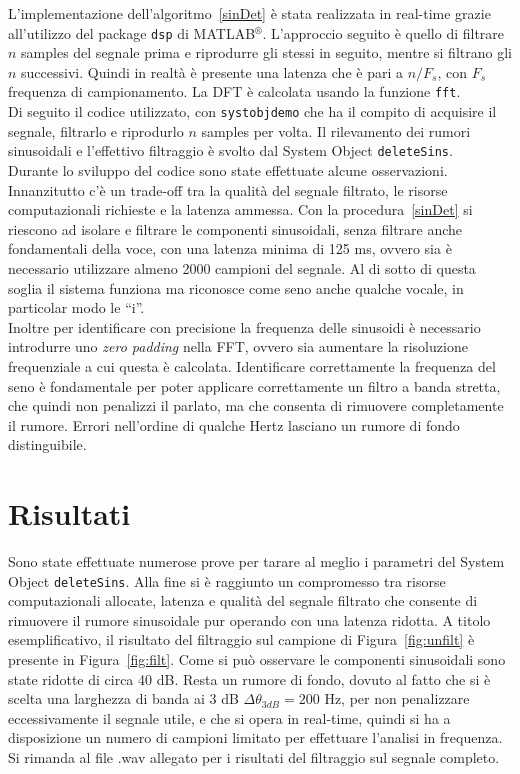 \documentclass[10pt,A4]{article}
\begin{document}
L'implementazione dell'algoritmo~\ref{sinDet} è stata realizzata in real-time grazie all'utilizzo del package \texttt{dsp} di MATLAB$^{\circledR}$. L'approccio seguito è quello di filtrare $n$ samples del segnale prima e riprodurre gli stessi in seguito, mentre si filtrano gli $n$ successivi. Quindi in realtà è presente una latenza che è pari a $n/F_s$, con $F_s$ frequenza di campionamento. La DFT è calcolata usando la funzione \texttt{fft}.\\
Di seguito il codice utilizzato, con \texttt{systobjdemo} che ha il compito di acquisire il segnale, filtrarlo e riprodurlo $n$ samples per volta. Il rilevamento dei rumori sinusoidali e l'effettivo filtraggio è svolto dal System Object \texttt{deleteSins}.\\
Durante lo sviluppo del codice sono state effettuate alcune osservazioni. Innanzitutto c'è un trade-off tra la qualità del segnale filtrato, le risorse computazionali richieste e la latenza ammessa. Con la procedura~\ref{sinDet} si riescono ad isolare e filtrare le componenti sinusoidali, senza filtrare anche fondamentali della voce, con una latenza minima di 125 ms, ovvero sia è necessario utilizzare almeno 2000 campioni del segnale. Al di sotto di questa soglia il sistema funziona ma riconosce come seno anche qualche vocale, in particolar modo le ``i''. \\
Inoltre per identificare con precisione la frequenza delle sinusoidi è necessario introdurre uno \textit{zero padding} nella FFT, ovvero sia aumentare la risoluzione frequenziale a cui questa è calcolata. Identificare correttamente la frequenza del seno è fondamentale per poter applicare correttamente un filtro a banda stretta, che quindi non penalizzi il parlato, ma che consenta di rimuovere completamente il rumore. Errori nell'ordine di qualche Hertz lasciano un rumore di fondo distinguibile.\\
\newpage

\newpage




\section{Risultati}
Sono state effettuate numerose prove per tarare al meglio i parametri del System Object \texttt{deleteSins}. Alla fine si è raggiunto un compromesso tra risorse computazionali allocate, latenza e qualità del segnale filtrato che consente di rimuovere il rumore sinusoidale pur operando con una latenza ridotta. A titolo esemplificativo, il risultato del filtraggio sul campione di Figura~\ref{fig:unfilt} è presente in Figura~\ref{fig:filt}. Come si può osservare le componenti sinusoidali sono state ridotte di circa 40 dB. Resta un rumore di fondo, dovuto al fatto che si è scelta una larghezza di banda ai 3 dB $\Delta\theta_{3dB} = 200$ Hz, per non penalizzare eccessivamente il segnale utile, e che si opera in real-time, quindi si ha a disposizione un numero di campioni limitato per effettuare l'analisi in frequenza. \\
Si rimanda al file .wav allegato per i risultati del filtraggio sul segnale completo.
\end{document}

